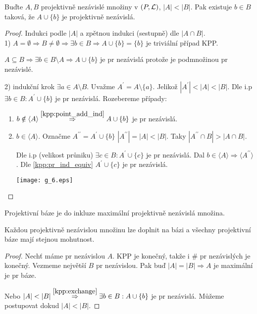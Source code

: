 \begin{theorem}[O výměně]\label{kpp:exchange}
    Buďte $A,B$ projektivně nezávislé množiny v $(P,\operatorname{\mathcal{L}})$, $|A| < |B|$.
    Pak existuje $b\in B$ taková, že $A\cup\{b\}$ je projektivně nezávislá.
\end{theorem}
\begin{proof}
	Indukci podle $|A|$ a zpětnou indukci (sestupně) dle $|A \cap B|$.\\
	1) $A = \emptyset \Rightarrow B \ne \emptyset \Rightarrow \exists b \in B \Rightarrow A \cup \{ b \} = \{ b \}$ je triviální případ KPP.

	$A \subseteq B \Rightarrow \exists b \in B \setminus A \Rightarrow A \cup \{ b \}$ je pr nezávislá protože je podmnožinou pr nezávislé.

	2) indukční krok $\exists a \in A \setminus B$.
	Uvažme $A^{\prime} = A \setminus \{ a \}$.
	Jelikož $|A^{\prime}| < |A| < |B|$.
	Dle i.p $\exists b \in B: A^{\prime} \cup \{ b \}$ je pr nezávislá.
	Rozebereme případy:
	\begin{enumerate}
		\item $b \notin \langle A \rangle \stackrel{\cref{kpp:point_add_ind}}{\Rightarrow} A \cup \{ b \}$ je pr nezávislá.
		\item $b \in \langle A \rangle$.
			Označme $A^{\prime\prime} = A^{\prime} \cup \{ b \}$
			$|A^{\prime\prime}| = |A| < |B|$.
			Taky $|A^{\prime\prime} \cap B| > |A \cap B|$.

			Dle i.p (velikost průniku) $\exists c \in B: A^{\prime} \cup \{ c \}$ je pr nezávislá.
			Dal $b \in \langle A \rangle \Rightarrow \langle A^{\prime\prime} \rangle$.
			Dle \cref{kpp:pr_ind_equiv} $A^{\prime} \cup \{ c \}$ je pr nezávislá.

		\texttt{[image: g\_6.eps]}
	\end{enumerate}
\end{proof}

\begin{definition}
    Projektivní báze je do inkluze maximální projektivně nezávislá množina.
\end{definition}
\begin{consequence}\label{kpp:basis}
    Každou projektivně nezávislou množinu lze doplnit na bázi a všechny projektivní báze mají stejnou mohutnost.
\end{consequence}
\begin{proof}
	Nechť máme pr nezávislou $A$.
	KPP je konečný, takže i \# pr nezávislých je konečný.
	Vezmeme největší $B$ pr nezávislou.
	Pak buď $|A| = |B| \Rightarrow A$ je maximální je pr báze.

	Nebo $|A| < |B| \stackrel{\cref{kpp:exchange}}{\Rightarrow} \exists b \in B: A \cup \{ b \}$ je pr nezávislá.
	Můžeme postupovat dokud $|A| < |B|$.
\end{proof}

